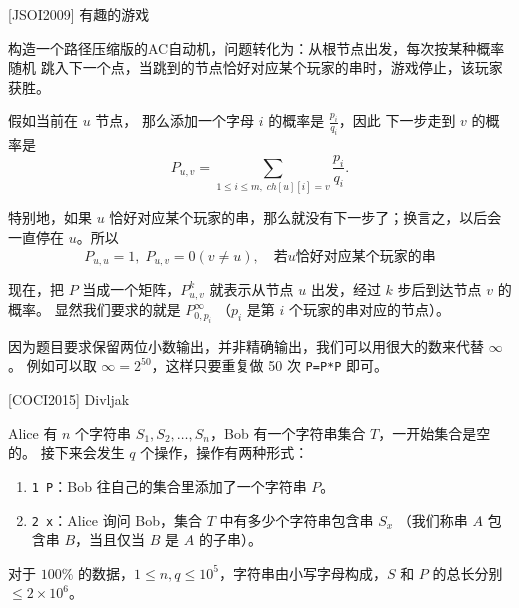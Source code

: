 \documentclass{beamer}
\begin{document}
\begin{frame}[fragile]{[JSOI2009] 有趣的游戏}
    \footnotesize

    构造一个路径压缩版的AC自动机，问题转化为：从根节点出发，每次按某种概率随机
    跳入下一个点，当跳到的节点恰好对应某个玩家的串时，游戏停止，该玩家获胜。
    
    \vspace{1em}\pause
    假如当前在 $u$ 节点，
    那么添加一个字母 $i$ 的概率是 $\frac{p_i}{q_i}$，因此
    下一步走到 $v$ 的概率是
    \begin{equation*}
        P_{u,v}=\sum_{1\leq i\leq m,\; ch[u][i]=v} \frac{p_i}{q_i}.
    \end{equation*}

    \vspace{1em}\pause
    特别地，如果 $u$ 恰好对应某个玩家的串，那么就没有下一步了；换言之，以后会一直停在 $u$。所以
    \begin{equation*}
        P_{u,u}=1,\;P_{u,v}=0(v\neq u),\quad \text{若} u \text{恰好对应某个玩家的串}
    \end{equation*}

    \vspace{1em}\pause
    现在，把 $P$ 当成一个矩阵，$P^k_{u,v}$ 就表示从节点 $u$ 出发，经过 $k$ 步后到达节点 $v$ 的概率。
    显然我们要求的就是 $P^\infty_{0,p_i}$ （$p_i$ 是第 $i$ 个玩家的串对应的节点）。
    
    \vspace{1em}\pause
    因为题目要求保留两位小数输出，并非精确输出，我们可以用很大的数来代替 $\infty$。
    例如可以取 $\infty=2^50$，这样只要重复做 50 次 \verb|P=P*P| 即可。
\end{frame}

\begin{frame}[fragile]{[COCI2015] Divljak}
    \footnotesize

    Alice 有 $n$ 个字符串 ${S}_1, {S}_2, \ldots, {S}_n$，Bob 有一个字符串集合 ${T}$，一开始集合是空的。
    接下来会发生 $q$ 个操作，操作有两种形式：

    \begin{enumerate}
        \item \verb|1 P|：Bob 往自己的集合里添加了一个字符串 ${P}$。
        \item \verb|2 x|：Alice 询问 Bob，集合 ${T}$ 中有多少个字符串包含串 ${S}_x$
        （我们称串 ${A}$ 包含串 ${B}$，当且仅当 ${B}$ 是 ${A}$ 的子串）。
    \end{enumerate}

    \vspace{1em}
    对于 $100\%$ 的数据，$1 \leq n,q \leq 10^5$，字符串由小写字母构成，$S$ 和 $P$ 的总长分别 $\le 2 \times 10^6$。
\end{frame}
\end{document}
